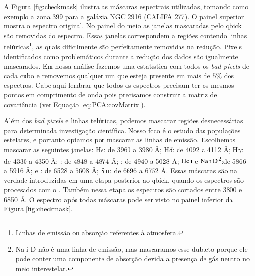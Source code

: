 A Figura \ref{fig:checkmask} ilustra as máscaras espectrais utilizadas, tomando como exemplo a zona 399 para a galáxia
NGC 2916 (CALIFA 277). O painel superior mostra o espectro original. No painel do meio as janelas mascaradas pelo {\sc
qbick} são removidas do espectro. Essas janelas correspondem a regiões contendo linhas telúricas\footnote{Linhas de
emissão ou absorção referentes à atmosfera.}, as quais dificilmente são perfeitamente removidas na redução. Pixels
identificados como problemáticos durante a redução dos dados são igualmente mascarados. Em nossa análise fazemos uma
estatística com todos os {\em bad pixels} de cada cubo e removemos qualquer um que esteja presente em mais de $5\%$ dos
espectros. Cabe aqui lembrar que todos os espectros precisam ter os mesmos pontos em comprimento de onda pois precisamos
construir a matriz de covariância (ver Equação \ref{eq:PCA:covMatrix}).
                                                                                                                                                                                                                                                                               
Além dos {\em bad pixels} e linhas telúricas, podemos mascarar regiões desnecessárias para determinada investigação
científica. Nosso foco é o estudo das populações estelares, e portanto optamos por mascarar as linhas de emissão.
Escolhemos mascarar as seguintes janelas: $\mathrm{H}\epsilon$: de 3960 a 3980 \AA; $\mathrm{H}\delta$: de 4092 a 4112
\AA; $\mathrm{H}\gamma$: de 4330 a 4350 \AA; \Hbeta: de 4848 a 4874 \AA; \oIII: de 4940 a 5028 \AA;
$\mathrm{He\,\textsc{i}}$ e $\mathrm{Na\,\textsc{i}\ D}$\footnote{Na {\sc i} D não é uma linha de emissão, mas
mascaramos esse dubleto porque ele pode conter uma componente de absorção devida a presença de gás neutro no meio
interestelar.}:de 5866 a 5916 \AA; \Halpha e \nII: de 6528 a 6608 \AA; $\mathrm{S\,\textsc{ii}}$: de 6696 a 6752 \AA.
Essas máscaras são na verdade introduzidas em uma etapa posterior ao {\sc qbick}, quando os espectros são procesados com
o \starlight. Também nessa etapa os espectros são cortados entre 3800 e 6850 \AA. O espectro após todas máscaras pode
ser visto no painel inferior da Figura \ref{fig:checkmask}.

